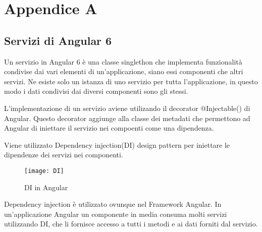 
\chapter{Appendice A}
\section{Servizi di Angular 6}
 Un servizio in Angular 6 è una classe singlethon che implementa funzionalità condivise dai vari elementi di un’applicazione, siano essi componenti che altri servizi.
Ne esiste solo un istanza di uno servizio per tutta l'applicazione, in questo modo i dati condivisi dai diversi componenti sono gli stessi.

L'implementazione di un servizio aviene utilizando il decorator @Injectable() di Angular. Questo decorator aggiunge alla classe dei metadati che permettono ad Angular di iniettare il servizio nei compoenti come una dipendenza. 

Viene utilizzato Dependency injection(DI) design pattern per iniettare le dipendenze dei servizi nei componenti. 
\begin{figure}[!h] 
	\centering 
	\texttt{[image: DI]} 
	\caption{DI in Angular}
\end{figure}
Dependency injection è utilizzato ovunque nel Framework Angular. In un'applicazione Angular un componente in media consuma molti servizi utilizzando DI, che li fornisce accesso a tutti i metodi e ai dati forniti dal servizio. 
